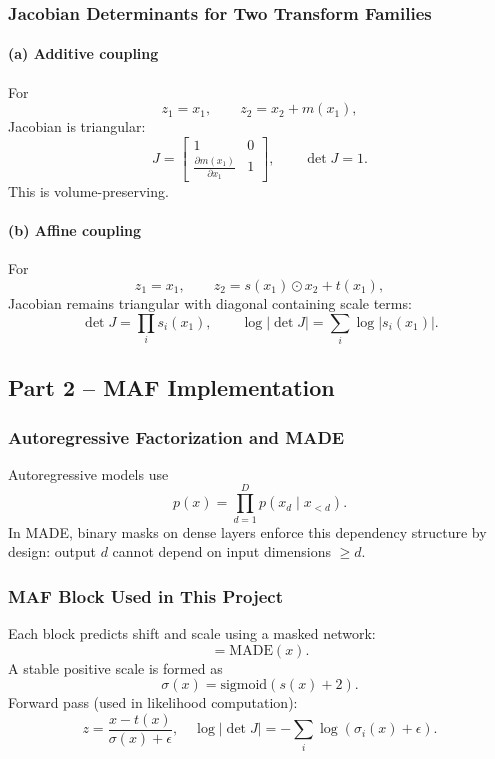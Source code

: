 \documentclass[conference]{IEEEtran}
\begin{document}
\subsubsection{Jacobian Determinants for Two Transform Families}

\paragraph{(a) Additive coupling}
For
\begin{equation}
 z_1=x_1,\qquad z_2=x_2+m(x_1),
\end{equation}
Jacobian is triangular:
\begin{equation}
J=
\begin{bmatrix}
1 & 0 \\
\frac{\partial m(x_1)}{\partial x_1} & 1
\end{bmatrix},
\qquad \det J=1.
\end{equation}
This is volume-preserving.

\paragraph{(b) Affine coupling}
For
\begin{equation}
 z_1=x_1,\qquad z_2=s(x_1)\odot x_2+t(x_1),
\end{equation}
Jacobian remains triangular with diagonal containing scale terms:
\begin{equation}
 \det J=\prod_i s_i(x_1),\qquad
 \log|\det J|=\sum_i \log|s_i(x_1)|.
\end{equation}

\subsection{Part 2 -- MAF Implementation}

\subsubsection{Autoregressive Factorization and MADE}
Autoregressive models use
\begin{equation}
 p(x)=\prod_{d=1}^{D}p(x_d\mid x_{<d}).
\end{equation}
In MADE, binary masks on dense layers enforce this dependency structure by design: output $d$ cannot depend on input dimensions $\ge d$.

\subsubsection{MAF Block Used in This Project}
Each block predicts shift and scale using a masked network:
\begin{equation}
[s(x),t(x)] = \text{MADE}(x).
\end{equation}
A stable positive scale is formed as
\begin{equation}
\sigma(x)=\text{sigmoid}(s(x)+2).
\end{equation}
Forward pass (used in likelihood computation):
\begin{equation}
z=\frac{x-t(x)}{\sigma(x)+\epsilon},
\quad
\log|\det J|=-\sum_i\log(\sigma_i(x)+\epsilon).
\end{equation}
\end{document}
